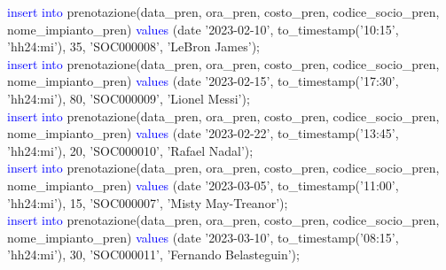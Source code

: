\documentclass{article}
\begin{document}
\begin{flushleft}
{        \vspace{2mm}
        \hspace*{0.5em}\textcolor{blue}{insert into} prenotazione(data\_pren, ora\_pren, costo\_pren, codice\_socio\_pren, \hspace*{0.5em}nome\_impianto\_pren) \textcolor{blue}{values} (date '2023-02-10', to\_timestamp('10:15', 'hh24:mi'), \hspace*{0.5em}35, 'SOC000008', 'LeBron James'); \\
        \vspace{2mm}
        \hspace*{0.5em}\textcolor{blue}{insert into} prenotazione(data\_pren, ora\_pren, costo\_pren, codice\_socio\_pren, \hspace*{0.5em}nome\_impianto\_pren) \textcolor{blue}{values} (date '2023-02-15', to\_timestamp('17:30', 'hh24:mi'), \hspace*{0.5em}80, 'SOC000009', 'Lionel Messi'); \\
        \vspace{2mm}
        \hspace*{0.5em}\textcolor{blue}{insert into} prenotazione(data\_pren, ora\_pren, costo\_pren, codice\_socio\_pren, \hspace*{0.5em}nome\_impianto\_pren) \textcolor{blue}{values} (date '2023-02-22', to\_timestamp('13:45', 'hh24:mi'), \hspace*{0.5em}20, 'SOC000010', 'Rafael Nadal'); \\
        \vspace{2mm}
        \hspace*{0.5em}\textcolor{blue}{insert into} prenotazione(data\_pren, ora\_pren, costo\_pren, codice\_socio\_pren, \hspace*{0.5em}nome\_impianto\_pren) \textcolor{blue}{values} (date '2023-03-05', to\_timestamp('11:00', 'hh24:mi'), \hspace*{0.5em}15, 'SOC000007', 'Misty May-Treanor'); \\
        \vspace{2mm}
        \hspace*{0.5em}\textcolor{blue}{insert into} prenotazione(data\_pren, ora\_pren, costo\_pren, codice\_socio\_pren, \hspace*{0.5em}nome\_impianto\_pren) \textcolor{blue}{values} (date '2023-03-10', to\_timestamp('08:15', 'hh24:mi'), \hspace*{0.5em}30, 'SOC000011', 'Fernando Belasteguin'); \\
        \vspace{2mm}
}
\end{flushleft}
\end{document}
